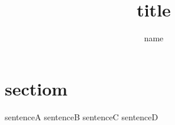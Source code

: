 \documentclass{jarticle}
\title{title}
\author{name}
\begin{document}
\maketitle
\section{sectiom}
sentenceA
sentenceB
sentenceC
sentenceD
\end{document}
